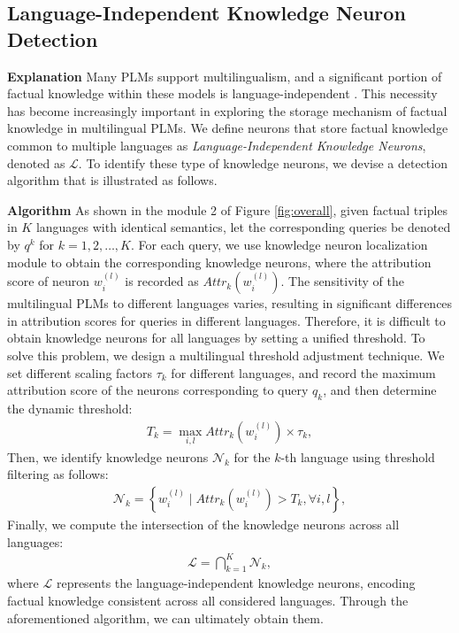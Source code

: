 \documentclass[]{article}
\newcommand{\vpara}[1]{\vspace{0.05in}\noindent\textbf{#1 }}
\begin{document}
\subsection{Language-Independent Knowledge Neuron Detection}
\vpara{Explanation} Many PLMs support multilingualism, and a significant portion of factual knowledge within these models is language-independent \cite{m-language-edit, wang-etal-2020-negative}. This necessity has become increasingly important in exploring the storage mechanism of factual knowledge in multilingual PLMs. We define neurons that store factual knowledge common to multiple languages as \textit{Language-Independent Knowledge Neurons}, denoted as $\mathcal{L}$. To identify these type of knowledge neurons, we devise a detection algorithm that is illustrated as follows.

\vpara{Algorithm} As shown in the module 2 of Figure \ref{fig:overall}, given factual triples in $K$ languages with identical semantics, let the corresponding queries be denoted by $q^k$ for $k=1, 2, \ldots, K$. For each query, we use knowledge neuron localization module to obtain the corresponding knowledge neurons, where the attribution score of neuron $w_i^{(l)}$ is recorded as $Attr_k(w_i^{(l)})$. The sensitivity of the multilingual PLMs to different languages varies, resulting in significant differences in attribution scores for queries in different languages. Therefore, it is difficult to obtain knowledge neurons for all languages by setting a unified threshold. To solve this problem, we design a multilingual threshold adjustment technique. We set different scaling factors $\tau_k$ for different languages, and record the maximum attribution score of the neurons corresponding to query $q_k$, and then determine the dynamic threshold:
{\small\begin{align}
    T_k = \max_{i, l} Attr_k(w_i^{(l)}) \times \tau_k,
\end{align}}Then, we identify knowledge neurons \(\mathcal{N}_k\) for the \(k\)-th language using threshold filtering as follows:
{\small\begin{align}
    \mathcal{N}_k = \left\{ w_i^{(l)} \mid  Attr_k(w_i^{(l)}) > T_k,  \forall i, l \right\},
\end{align}}Finally, we compute the intersection of the knowledge neurons across all languages:
{\small\begin{align}
    \mathcal{L} = \bigcap_{k=1}^{K} \mathcal{N}_k,
\end{align} }where $\mathcal{L}$ represents the language-independent knowledge neurons, encoding factual knowledge consistent across all considered languages. Through the aforementioned algorithm, we can ultimately obtain them.
\end{document}
